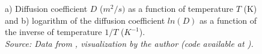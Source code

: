 \begin{figure}[h]
 \centering
 \captionsetup{justification=centering}
 \caption{a) Diffusion coefficient $D$ ($m^2/s)$ as a function of temperature $T$ (K) and b) logarithm of the diffusion coefficient $ln(D)$ as a function of the inverse of temperature $1/T$ ($K^{-1}$). \\
 \textit{Source: Data from \citep{kakusan}, visualization by the author (code available at \citep{mygit}).}}
 \label{fig:diffusion}
\end{figure}